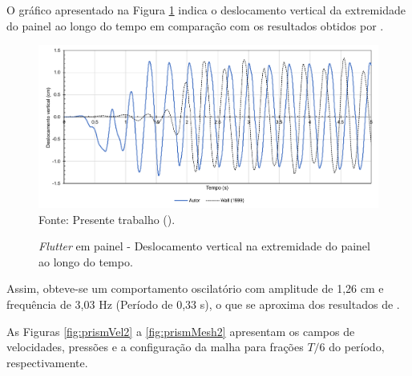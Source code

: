O gráfico apresentado na Figura \ref{fig:prismRes} indica o deslocamento vertical da extremidade do painel ao longo do tempo em comparação com os resultados obtidos por .

\begin{figure}[h!]
    \centering
    \caption{\textit{Flutter} em painel - Deslocamento vertical na extremidade do painel ao longo do tempo.}
    \includegraphics[width=\linewidth]{Figuras/FSI-prism2/results.pdf}
    \\Fonte: Presente trabalho (\the\year).
    \label{fig:prismRes}
\end{figure}

Assim, obteve-se um comportamento oscilatório com amplitude de 1,26 cm e frequência de 3,03 Hz (Período de 0,33 s), o que se aproxima dos resultados de .

As Figuras \ref{fig:prismVel2} a \ref{fig:prismMesh2} apresentam os campos de velocidades, pressões e a configuração da malha para frações $T/6$ do período, respectivamente.

